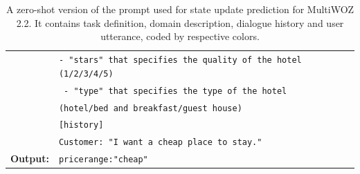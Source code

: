 \begin{table}[tp]
\begin{tabular}{rl}
      & \texttt{{\color{green!100!yellow!70!black!100!}- "stars" that specifies the quality of the hotel (1/2/3/4/5)}} \\
      & \texttt{{\color{green!100!yellow!70!black!100!} - "type" that specifies the type of the hotel}}\\
      & \texttt{{\color{green!100!yellow!70!black!100!}(hotel/bed and breakfast/guest house)}} \\
      & \texttt{{\color{red!100!yellow!70!black!100!}[history] }} \\
      &  \texttt{{\color{orange!50!yellow!90!black!100!}Customer: "I want a cheap place to stay." }}\\
      \midrule
      \textbf{Output:} & \texttt{pricerange:"cheap"}\\
      \bottomrule
  \end{tabular}
  \caption{A zero-shot version of the prompt used for state update prediction for MultiWOZ 2.2.
  It contains {\color{cyan!80!yellow!80!black!100} task definition},  {\color{green!100!yellow!70!black!100!}domain description}, {\color{red!100!yellow!70!black!100!} dialogue history} and {\color{orange!50!yellow!90!black!100!} user utterance}, coded by respective colors.}
  \label{07_tab:zero-shot-state}
\end{table}

